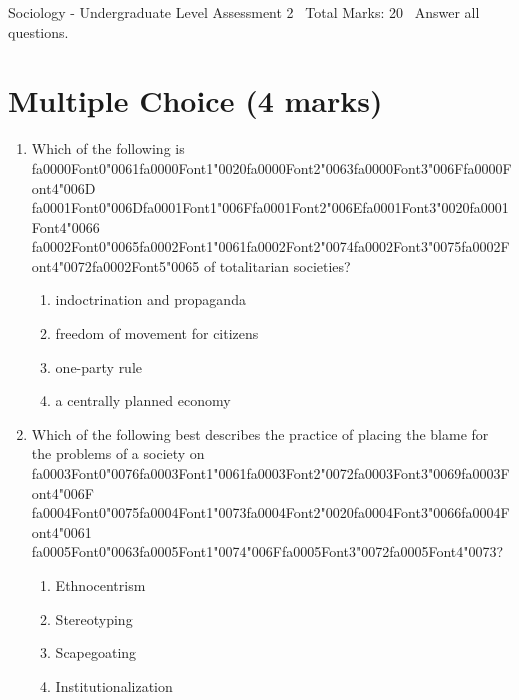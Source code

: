 \documentclass[12pt]{article}
\begin{document}
\begin{center}
Sociology - Undergraduate Level Assessment 2 \
Total Marks: 20 \
Answer all questions.
\end{center}

\section*{Multiple Choice (4 marks)}
\begin{enumerate}[label=\arabic*.]
\item Which of the following is {\csname fa0000Font0\endcsname\char"0061}{\csname fa0000Font1\endcsname\char"0020}{\csname fa0000Font2\endcsname\char"0063}{\csname fa0000Font3\endcsname\char"006F}{\csname fa0000Font4\endcsname\char"006D} {\csname fa0001Font0\endcsname\char"006D}{\csname fa0001Font1\endcsname\char"006F}{\csname fa0001Font2\endcsname\char"006E}{\csname fa0001Font3\endcsname\char"0020}{\csname fa0001Font4\endcsname\char"0066} {\csname fa0002Font0\endcsname\char"0065}{\csname fa0002Font1\endcsname\char"0061}{\csname fa0002Font2\endcsname\char"0074}{\csname fa0002Font3\endcsname\char"0075}{\csname fa0002Font4\endcsname\char"0072}{\csname fa0002Font5\endcsname\char"0065} of totalitarian societies?
\begin{enumerate}[label=(\alph*)]
    \item indoctrination and propaganda
    \item freedom of movement for citizens
    \item one-party rule
    \item a centrally planned economy
\end{enumerate}
\item Which of the following best describes the practice of placing the blame for the problems of a society on {\csname fa0003Font0\endcsname\char"0076}{\csname fa0003Font1\endcsname\char"0061}{\csname fa0003Font2\endcsname\char"0072}{\csname fa0003Font3\endcsname\char"0069}{\csname fa0003Font4\endcsname\char"006F} {\csname fa0004Font0\endcsname\char"0075}{\csname fa0004Font1\endcsname\char"0073}{\csname fa0004Font2\endcsname\char"0020}{\csname fa0004Font3\endcsname\char"0066}{\csname fa0004Font4\endcsname\char"0061} {\csname fa0005Font0\endcsname\char"0063}{\csname fa0005Font1\endcsname\char"0074}{\char"006F}{\csname fa0005Font3\endcsname\char"0072}{\csname fa0005Font4\endcsname\char"0073}?
\begin{enumerate}[label=(\alph*)]
    \item Ethnocentrism
    \item Stereotyping
    \item Scapegoating
    \item Institutionalization
\end{enumerate}
\end{enumerate}
\end{document}
